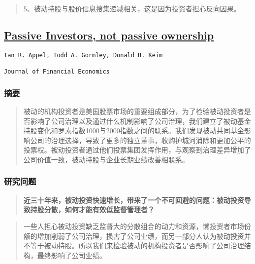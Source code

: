 \documentclass[
]{article}
\begin{document}
\begin{quote}
5、被动持股与股价信息搜集递减相关，这是因为投资者担心反向因果。
\end{quote}

\hypertarget{passive-investors-not-passive-ownership}{%
\subsection{\texorpdfstring{\href{https://doi.org/10.1016/j.jfineco.2016.03.003}{Passive
Investors, not passive
ownership}}{Passive Investors, not passive ownership}}\label{passive-investors-not-passive-ownership}}

\begin{verbatim}
Ian R. Appel, Todd A. Gormley, Donald B. Keim

Journal of Financial Economics
\end{verbatim}

\hypertarget{ux6458ux8981-5}{%
\subsubsection{摘要}\label{ux6458ux8981-5}}

\begin{quote}
被动的机构投资者是美国股票市场的重要组成部分，为了检验被动投资者是否影响了公司治理以及通过什么机制影响了公司治理，我们建立了被动基金持股变化和罗素指数1000与2000指数之间的联系。我们发现被动共同基金影响公司的治理选择，导致了更多的独立董事，收购护城河消除和更加公平的投票权。被动投资者通过他们投票集团发挥作用，与观察到治理差异增加了公司价值一致，被动持股与企业长期业绩改善相联系。
\end{quote}

\hypertarget{ux7814ux7a76ux95eeux9898-5}{%
\subsubsection{研究问题}\label{ux7814ux7a76ux95eeux9898-5}}

\begin{quote}
\textbf{近三十年来，被动投资快速增长，带来了一个不可回避的问题：被动投资导致持股分散，如何才能有效低监督管理者？}
\end{quote}

\begin{quote}
一些人担心被动投资缺乏监督大的分散组合的动力和资源，懒投资者市场份额的增加削弱了公司治理，损害了公司业绩，而另一部分人认为被动投资并不等于被动持股。所以我们来检验被动的机构投资者是否影响了公司治理结构，最终影响了公司业绩。
\end{quote}
\end{document}
